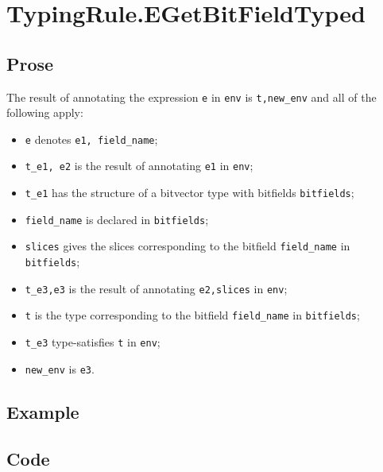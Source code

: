 \documentclass{book}
\begin{document}

\section{TypingRule.EGetBitFieldTyped \label{sec:TypingRule.EGetBitFieldTyped}}

  \subsection{Prose}
  The result of annotating the expression \texttt{e} in \texttt{env} is
\texttt{t,new\_env} and all of the following apply:
  \begin{itemize}
  \item \texttt{e} denotes \texttt{e1, field\_name};
  \item \texttt{t\_e1, e2} is the result of annotating \texttt{e1} in \texttt{env};
  \item \texttt{t\_e1} has the structure of a bitvector type with bitfields \texttt{bitfields};
  \item \texttt{field\_name} is declared in \texttt{bitfields};
  \item \texttt{slices} gives the slices corresponding to the bitfield \texttt{field\_name} in
    \texttt{bitfields};
  \item \texttt{t\_e3,e3} is the result of annotating \texttt{e2,slices} in \texttt{env};
  \item \texttt{t} is the type corresponding to the bitfield \texttt{field\_name} in \texttt{bitfields};
  \item \texttt{t\_e3} type-satisfies \texttt{t} in \texttt{env};
  \item \texttt{new\_env} is \texttt{e3}.
  \end{itemize}

  \subsection{Example}

  \subsection{Code}
\end{document}
